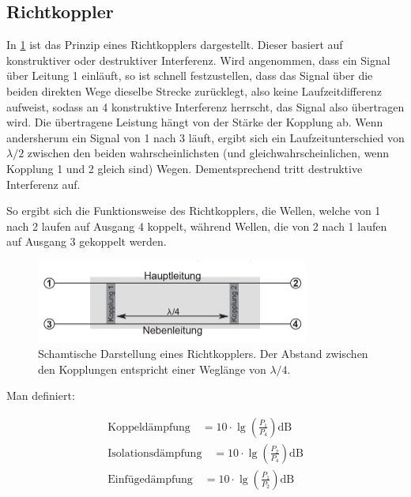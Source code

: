 \documentclass[
	a4paper,
	12pt,
	pagesize,
	ngerman
]{scrartcl}
\begin{document}
	\subsection{Richtkoppler} \label{ss_richt}

	In \cref{fig_richtkoppler} ist das Prinzip eines Richtkopplers dargestellt.
	Dieser basiert auf konstruktiver oder destruktiver Interferenz.
	Wird angenommen, dass ein Signal über Leitung 1 einläuft, so ist schnell festzustellen, dass das Signal über die beiden direkten Wege dieselbe Strecke zurücklegt, also keine Laufzeitdifferenz aufweist, sodass an 4 konstruktive Interferenz herrscht, das Signal also übertragen wird.
	Die übertragene Leistung hängt von der Stärke der Kopplung ab.
	Wenn andersherum ein Signal von 1 nach 3 läuft, ergibt sich ein Laufzeitunterschied von $\lambda/2$ zwischen den beiden wahrscheinlichsten (und gleichwahrscheinlichen, wenn Kopplung 1 und 2 gleich sind) Wegen.
	Dementsprechend tritt destruktive Interferenz auf.

	So ergibt sich die Funktionsweise des Richtkopplers, die Wellen, welche von 1 nach 2 laufen auf Ausgang 4 koppelt, während Wellen, die von 2 nach 1 laufen auf Ausgang 3 gekoppelt werden.

	\begin{figure}[H]
		\includegraphics[width=0.8\textwidth]{img/richtkoppler.png}
		\centering
		\caption{
			Schamtische Darstellung eines Richtkopplers. Der Abstand zwischen den Kopplungen entspricht einer Weglänge von $\lambda/4$. \cite{Anleitung}
		}
		\label{fig_richtkoppler}
		\centering
	\end{figure}

	Man definiert:

	\begin{align}
		\text{Koppeldämpfung} \quad = 10 \cdot \lg{ \left( \frac{P_1}{P_4} \right) } \si{\deci \bel}
		\label{eq_koppeld}\\
		\text{Isolationsdämpfung} \quad = 10 \cdot \lg{ \left( \frac{P_2}{P_4} \right) } \si{\deci \bel}
		\label{eq_isolation}\\
		\text{Einfügedämpfung} \quad = 10 \cdot \lg{ \left( \frac{P_1}{P_2} \right) } \si{\deci \bel}
		\label{eq_einfueged}\\
	\end{align}
\end{document}
